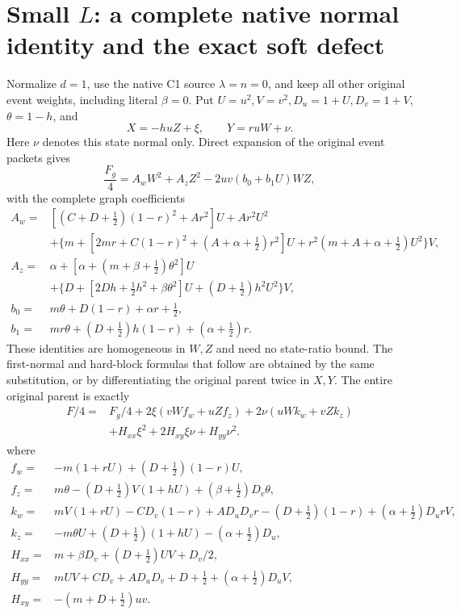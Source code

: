 \section{\texorpdfstring{Small $L$: a complete native normal identity and the exact soft defect}{Small L: a complete native normal identity and the exact soft defect}}
\label{component:pc15b7caff0a3}

\label{pc15b7caff0a3:sec:r8-small-L-native-normal}

Normalize $d=1$, use the native C1 source $\lambda=n=0$, and keep
all other original event weights, including literal $\beta=0$.
Put $U=u^2,V=v^2,D_u=1+U,D_v=1+V$, $\theta=1-h$, and
\[
             X=-huZ+\xi,\qquad Y=ruW+\nu.
\]
Here $\nu$ denotes this state normal only.  Direct expansion of the
original event packets gives
\[
 \frac{F_g}{4}=A_wW^2+A_zZ^2-2uv(b_0+b_1U)WZ,
\]
with the complete graph coefficients
\[
\begin{aligned}
 A_w={}&[(C+D+\tfrac12)(1-r)^2+Ar^2]U+Ar^2U^2\\
 &+\{m+[2mr+C(1-r)^2+(A+\alpha+\tfrac12)r^2]U
                  +r^2(m+A+\alpha+\tfrac12)U^2\}V,\\
 A_z={}&\alpha+[\alpha+(m+\beta+\tfrac12)\theta^2]U\\
 &+\{D+[2Dh+\tfrac12h^2+\beta\theta^2]U
                     +(D+\tfrac12)h^2U^2\}V,\\
 b_0={}&m\theta+D(1-r)+\alpha r+\tfrac12,\\
 b_1={}&mr\theta+(D+\tfrac12)h(1-r)+(\alpha+\tfrac12)r.
\end{aligned}
\]
These identities are homogeneous in $W,Z$ and need no state-ratio
bound.  The first-normal and hard-block formulas that follow are
obtained by the same substitution, or by differentiating the original
parent twice in $X,Y$.
The entire original parent is
exactly
\[
\begin{split}
 F/4={}&F_g/4+2\xi(vWf_w+uZf_z)+2\nu(uWk_w+vZk_z)\\
 &+H_{xx}\xi^2+2H_{xy}\xi\nu+H_{yy}\nu^2.
\end{split}                                               \tag{SN1}
\]
where
\[
\begin{aligned}
 f_w={}&-m(1+rU)+(D+\tfrac12)(1-r)U,\\
 f_z={}&m\theta-(D+\tfrac12)V(1+hU)
                    +(\beta+\tfrac12)D_v\theta,\\
 k_w={}&mV(1+rU)-CD_v(1-r)+AD_uD_vr
             -(D+\tfrac12)(1-r)+(\alpha+\tfrac12)D_urV,\\
 k_z={}&-m\theta U+(D+\tfrac12)(1+hU)
                              -(\alpha+\tfrac12)D_u,\\
 H_{xx}={}&m+\beta D_v+(D+\tfrac12)UV+D_v/2,\\
 H_{yy}={}&mUV+CD_v+AD_uD_v+D+\tfrac12
                              +(\alpha+\tfrac12)D_uV,\\
 H_{xy}={}&-(m+D+\tfrac12)uv.
\end{aligned}                                                   \tag{SN2}
\]
